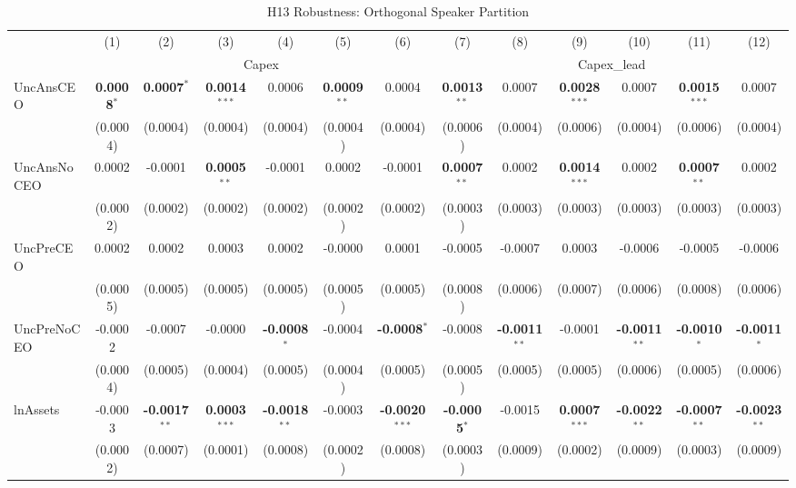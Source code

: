 \documentclass[11pt,a4paper]{article}
\begin{document}
\begin{table}[htbp]
\centering
\caption{H13 Robustness: Orthogonal Speaker Partition}
\label{tab:h13_robust}
\scriptsize
\begin{tabular}{lcccccccccccc}
\toprule
 & (1) & (2) & (3) & (4) & (5) & (6) & (7) & (8) & (9) & (10) & (11) & (12) \\
 & \multicolumn{6}{c}{Capex} & \multicolumn{6}{c}{Capex\_lead} \\
\cmidrule(lr){2-7} \cmidrule(lr){8-13}
\midrule
UncAnsCEO & \textbf{0.0008}$^{*}$ & \textbf{0.0007}$^{*}$ & \textbf{0.0014}$^{***}$ & 0.0006 & \textbf{0.0009}$^{**}$ & 0.0004 & \textbf{0.0013}$^{**}$ & 0.0007 & \textbf{0.0028}$^{***}$ & 0.0007 & \textbf{0.0015}$^{***}$ & 0.0007 \\
 & (0.0004) & (0.0004) & (0.0004) & (0.0004) & (0.0004) & (0.0004) & (0.0006) & (0.0004) & (0.0006) & (0.0004) & (0.0006) & (0.0004) \\
UncAnsNoCEO & 0.0002 & -0.0001 & \textbf{0.0005}$^{**}$ & -0.0001 & 0.0002 & -0.0001 & \textbf{0.0007}$^{**}$ & 0.0002 & \textbf{0.0014}$^{***}$ & 0.0002 & \textbf{0.0007}$^{**}$ & 0.0002 \\
 & (0.0002) & (0.0002) & (0.0002) & (0.0002) & (0.0002) & (0.0002) & (0.0003) & (0.0003) & (0.0003) & (0.0003) & (0.0003) & (0.0003) \\
UncPreCEO & 0.0002 & 0.0002 & 0.0003 & 0.0002 & -0.0000 & 0.0001 & -0.0005 & -0.0007 & 0.0003 & -0.0006 & -0.0005 & -0.0006 \\
 & (0.0005) & (0.0005) & (0.0005) & (0.0005) & (0.0005) & (0.0005) & (0.0008) & (0.0006) & (0.0007) & (0.0006) & (0.0008) & (0.0006) \\
UncPreNoCEO & -0.0002 & -0.0007 & -0.0000 & \textbf{-0.0008}$^{*}$ & -0.0004 & \textbf{-0.0008}$^{*}$ & -0.0008 & \textbf{-0.0011}$^{**}$ & -0.0001 & \textbf{-0.0011}$^{**}$ & \textbf{-0.0010}$^{*}$ & \textbf{-0.0011}$^{*}$ \\
 & (0.0004) & (0.0005) & (0.0004) & (0.0005) & (0.0004) & (0.0005) & (0.0005) & (0.0005) & (0.0005) & (0.0006) & (0.0005) & (0.0006) \\
\midrule
lnAssets & -0.0003 & \textbf{-0.0017}$^{**}$ & \textbf{0.0003}$^{***}$ & \textbf{-0.0018}$^{**}$ & -0.0003 & \textbf{-0.0020}$^{***}$ & \textbf{-0.0005}$^{*}$ & -0.0015 & \textbf{0.0007}$^{***}$ & \textbf{-0.0022}$^{**}$ & \textbf{-0.0007}$^{**}$ & \textbf{-0.0023}$^{**}$ \\
 & (0.0002) & (0.0007) & (0.0001) & (0.0008) & (0.0002) & (0.0008) & (0.0003) & (0.0009) & (0.0002) & (0.0009) & (0.0003) & (0.0009) \\

\end{tabular}
\end{table}
\end{document}
